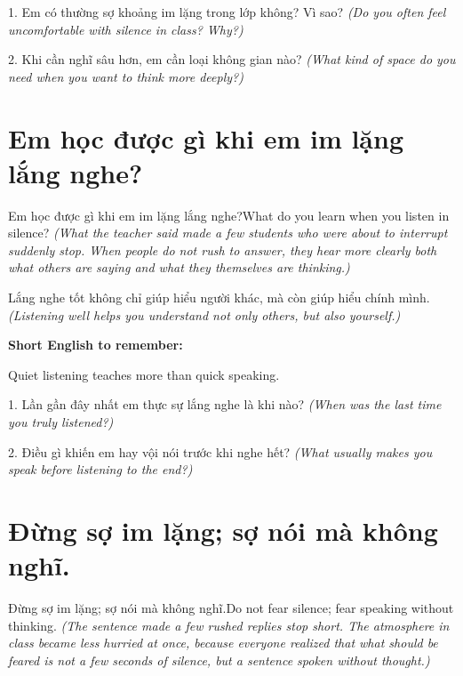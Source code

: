 \begin{tuhocnhanh}
1. Em có thường sợ khoảng im lặng trong lớp không? Vì sao? \textit{(Do you often feel uncomfortable with silence in class? Why?)}

2. Khi cần nghĩ sâu hơn, em cần loại không gian nào? \textit{(What kind of space do you need when you want to think more deeply?)}
\end{tuhocnhanh}
\ngancach


\section{Em học được gì khi em im lặng lắng nghe?}
\begin{truyen}{Em học được gì khi em im lặng lắng nghe?}{What do you learn when you listen in silence?}
\textit{(What the teacher said made a few students who were about to interrupt suddenly stop. When people do not rush to answer, they hear more clearly both what others are saying and what they themselves are thinking.)}
\end{truyen}

\begin{baihoc}
Lắng nghe tốt không chỉ giúp hiểu người khác, mà còn giúp hiểu chính mình.
\textit{(Listening well helps you understand not only others, but also yourself.)}
\end{baihoc}

\begin{ghinhoanh}
\textbf{Short English to remember:}

Quiet listening teaches more than quick speaking.

\end{ghinhoanh}

\begin{tuhocnhanh}
1. Lần gần đây nhất em thực sự lắng nghe là khi nào? \textit{(When was the last time you truly listened?)}

2. Điều gì khiến em hay vội nói trước khi nghe hết? \textit{(What usually makes you speak before listening to the end?)}
\end{tuhocnhanh}
\ngancach


\section{Đừng sợ im lặng; sợ nói mà không nghĩ.}
\begin{truyen}{Đừng sợ im lặng; sợ nói mà không nghĩ.}{Do not fear silence; fear speaking without thinking.}
\textit{(The sentence made a few rushed replies stop short. The atmosphere in class became less hurried at once, because everyone realized that what should be feared is not a few seconds of silence, but a sentence spoken without thought.)}
\end{truyen}

